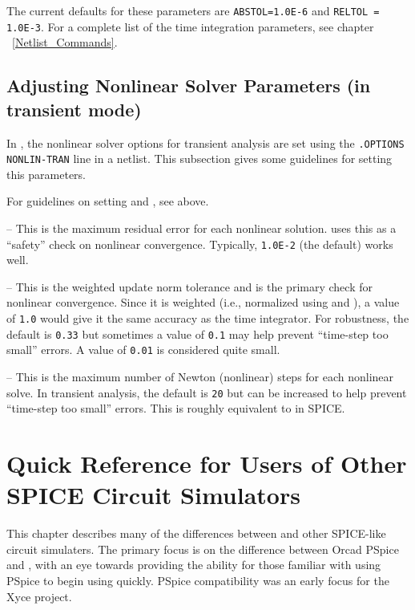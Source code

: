 The current defaults for these parameters are \texttt{ABSTOL=1.0E-6} and
\texttt{RELTOL = 1.0E-3}.  For a complete list of the time integration
parameters, see chapter ~\ref{Netlist_Commands}.

\section{Adjusting Nonlinear Solver Parameters (in transient mode)}

In \Xyce{}, the nonlinear solver options for transient analysis are set using
the \texttt{.OPTIONS NONLIN-TRAN} line in a netlist.  This subsection gives
some guidelines for setting this parameters.
\begin{XyceItemize}
\item For guidelines on setting  and , see above.
\item {} -- This is the maximum residual error for each nonlinear
  solution.  \Xyce{} uses this as a ``safety'' check on nonlinear
  convergence.  Typically, \texttt{1.0E-2} (the default) works well.
\item {} -- This is the weighted update norm tolerance and is
  the primary check for nonlinear convergence.  Since it is weighted (i.e.,
  normalized using  and \mbox{}), a value of
  \texttt{1.0} would give it the same accuracy as the time integrator.  For
  robustness, the default is \texttt{0.33} but sometimes a value of
  \texttt{0.1} may help prevent ``time-step too small'' errors.  A value of
  \texttt{0.01} is considered quite small.
\item {} -- This is the maximum number of Newton (nonlinear)
  steps for each nonlinear solve.  In transient analysis, the default is
  \texttt{20} but can be increased to help prevent ``time-step too small''
  errors.  This is roughly equivalent to  in SPICE.
\end{XyceItemize}

\chapter{Quick Reference for Users of Other SPICE 
Circuit Simulators}
\label{PSpice_Ref}

This chapter describes many of the differences between \Xyce{} and
other SPICE-like circuit simulaters.  The primary focus is on the difference
between Orcad PSpice and \Xyce{}, with an eye towards providing the ability for those
familiar with using PSpice to begin using \Xyce{} quickly.   PSpice compatibility 
was an early focus for the Xyce project.

